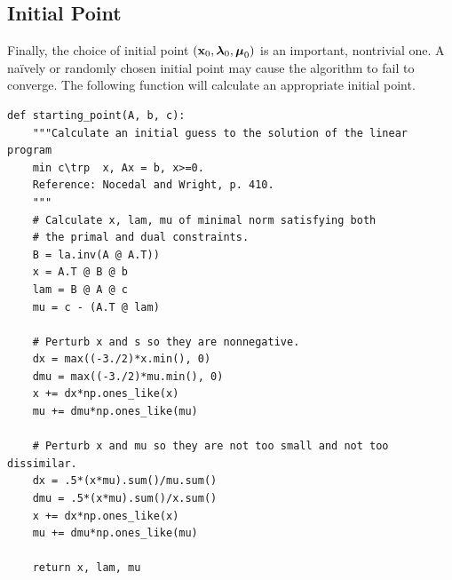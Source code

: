 \subsection*{Initial Point}
Finally, the choice of initial point $(\mathbf{x}_0, \boldsymbol{\lambda}_0, \boldsymbol{\mu}_0)$ is an important, nontrivial one.
A na\"{i}vely or randomly chosen initial point may cause the algorithm to fail to converge.
The following function will calculate an appropriate initial point.

\begin{lstlisting}
def starting_point(A, b, c):
    """Calculate an initial guess to the solution of the linear program
    min c\trp  x, Ax = b, x>=0.
    Reference: Nocedal and Wright, p. 410.
    """
    # Calculate x, lam, mu of minimal norm satisfying both
    # the primal and dual constraints.
    B = la.inv(A @ A.T))
    x = A.T @ B @ b
    lam = B @ A @ c
    mu = c - (A.T @ lam)

    # Perturb x and s so they are nonnegative.
    dx = max((-3./2)*x.min(), 0)
    dmu = max((-3./2)*mu.min(), 0)
    x += dx*np.ones_like(x)
    mu += dmu*np.ones_like(mu)

    # Perturb x and mu so they are not too small and not too dissimilar.
    dx = .5*(x*mu).sum()/mu.sum()
    dmu = .5*(x*mu).sum()/x.sum()
    x += dx*np.ones_like(x)
    mu += dmu*np.ones_like(mu)

    return x, lam, mu
\end{lstlisting}

